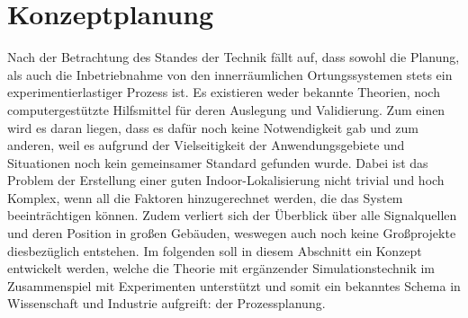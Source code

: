 \chapter{Konzeptplanung}
Nach der Betrachtung des Standes der Technik fällt auf, dass sowohl die Planung, als auch die Inbetriebnahme von den innerräumlichen Ortungssystemen stets ein experimentierlastiger Prozess ist. Es existieren weder bekannte Theorien, noch computergestützte Hilfsmittel für deren Auslegung und Validierung. Zum einen wird es daran liegen, dass es dafür noch keine Notwendigkeit gab und zum anderen, weil es aufgrund der Vielseitigkeit der Anwendungsgebiete und Situationen noch kein gemeinsamer Standard gefunden wurde. Dabei ist das Problem der Erstellung einer guten Indoor-Lokalisierung nicht trivial und hoch Komplex, wenn all die Faktoren hinzugerechnet werden, die das System beeinträchtigen können. Zudem verliert sich der Überblick über alle Signalquellen und deren Position in großen Gebäuden, weswegen auch noch keine Großprojekte diesbezüglich entstehen. Im folgenden soll in diesem Abschnitt ein Konzept entwickelt werden, welche die Theorie mit ergänzender Simulationstechnik im Zusammenspiel mit Experimenten unterstützt und somit ein bekanntes Schema in Wissenschaft und Industrie aufgreift: der Prozessplanung.
